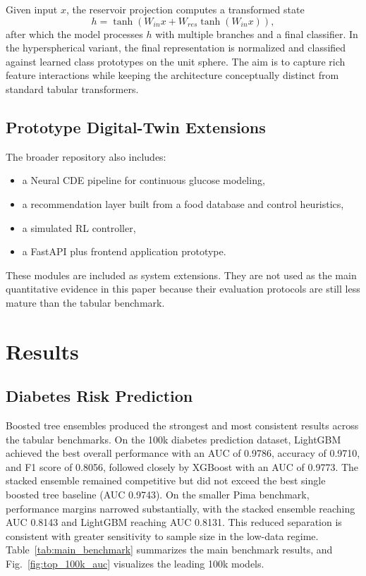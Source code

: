 \documentclass[conference]{IEEEtran}
\begin{document}
Given input $x$, the reservoir projection computes a transformed state
\begin{equation}
h = \tanh(W_{in}x + W_{res}\tanh(W_{in}x)),
\end{equation}
after which the model processes $h$ with multiple branches and a final classifier. In the hyperspherical variant, the final representation is normalized and classified against learned class prototypes on the unit sphere. The aim is to capture rich feature interactions while keeping the architecture conceptually distinct from standard tabular transformers.

\subsection{Prototype Digital-Twin Extensions}
The broader repository also includes:
\begin{itemize}
    \item a Neural CDE pipeline for continuous glucose modeling,
    \item a recommendation layer built from a food database and control heuristics,
    \item a simulated RL controller,
    \item a FastAPI plus frontend application prototype.
\end{itemize}

These modules are included as system extensions. They are not used as the main quantitative evidence in this paper because their evaluation protocols are still less mature than the tabular benchmark.

\section{Results}

\subsection{Diabetes Risk Prediction}
Boosted tree ensembles produced the strongest and most consistent results across the tabular benchmarks. On the 100k diabetes prediction dataset, LightGBM achieved the best overall performance with an AUC of 0.9786, accuracy of 0.9710, and F1 score of 0.8056, followed closely by XGBoost with an AUC of 0.9773. The stacked ensemble remained competitive but did not exceed the best single boosted tree baseline (AUC 0.9743). On the smaller Pima benchmark, performance margins narrowed substantially, with the stacked ensemble reaching AUC 0.8143 and LightGBM reaching AUC 0.8131. This reduced separation is consistent with greater sensitivity to sample size in the low-data regime. Table~\ref{tab:main_benchmark} summarizes the main benchmark results, and Fig.~\ref{fig:top_100k_auc} visualizes the leading 100k models.
\end{document}
